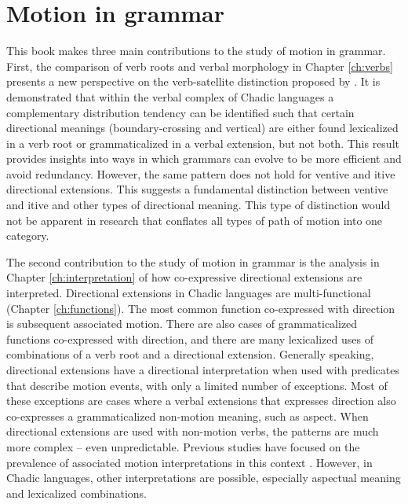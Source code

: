 \section{Motion in grammar}

This book makes three main contributions to the study of motion in grammar. First, the comparison of verb roots and verbal morphology in Chapter \ref{ch:verbs} presents a new perspective on the verb-satellite distinction proposed by \citet{talmyLexicalizationPatternsSemantic1985}. It is demonstrated that within the verbal complex of Chadic languages a complementary distribution tendency can be identified such that certain directional meanings (boundary-crossing and vertical) are either found lexicalized in a verb root or grammaticalized in a verbal extension, but not both. This result provides insights into ways in which grammars can evolve to be more efficient and avoid redundancy. However, the same pattern does not hold for ventive and itive directional extensions. This suggests a fundamental distinction between ventive and itive and other types of directional meaning. This type of distinction would not be apparent in research that conflates all types of path of motion into one category. 

The second contribution to the study of motion in grammar is the analysis in Chapter \ref{ch:interpretation} of how co-expressive directional extensions are interpreted. Directional extensions in Chadic languages are multi-functional (Chapter \ref{ch:functions}). The most common function co-expressed with direction is subsequent associated motion. There are also cases of grammaticalized functions co-expressed with direction, and there are many lexicalized uses of combinations of a verb root and a directional extension. Generally speaking, directional extensions have a directional interpretation when used with predicates that describe motion events, with only a limited number of exceptions. Most of these exceptions are cases where a verbal extensions that expresses direction also co-expresses a grammaticalized non-motion meaning, such as aspect. When directional extensions are used with non-motion verbs, the patterns are much more complex -- even unpredictable. Previous studies have focused on the prevalence of associated motion interpretations in this context \citep{belkadiAssociatedMotionDeictic2015,belkadiAssociatedMotionConstructions2016,genettiDirectionAssociatedMotion2020,rossCrosslinguisticSurveyAssociated2021}. However, in Chadic languages, other interpretations are possible, especially aspectual meaning and lexicalized combinations.

